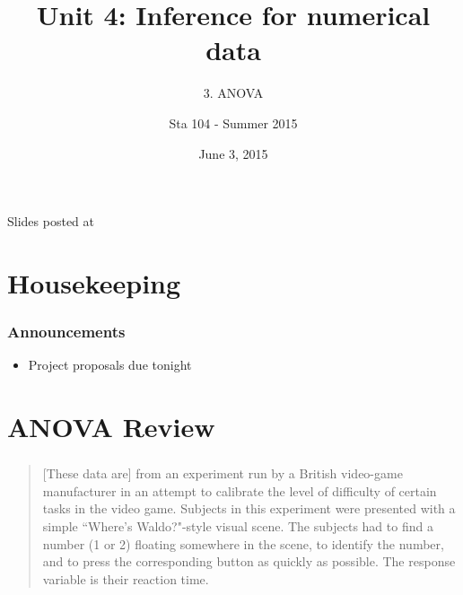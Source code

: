 \documentclass[slidestop,compress,mathserif,12pt,t,professionalfonts,xcolor=table]{beamer}
\title{Unit 4: Inference for numerical data}
\subtitle{3. ANOVA}
\author{Sta 104 - Summer 2015}
\date{June 3, 2015}
\institute{Duke University, Department of Statistical Science}
\begin{document}



\begin{frame}[plain]

\titlepage
\vfill
{\scriptsize {} \hfill Slides posted at  \webLink{\CourseSite}{\CourseSite}}
\addtocounter{framenumber}{-1} 

\end{frame}


\section{Housekeeping}


\begin{frame}
\frametitle{Announcements}

\begin{itemize}

\item Project proposals due tonight

\end{itemize}

\end{frame}


\section{ANOVA Review}


\begin{frame}
  \frametitle{}

\vfill

\begin{quote} 
[These data are] from an experiment run by a British video-game manufacturer in an attempt to calibrate the level of difficulty of certain tasks in the video game. Subjects in this experiment were presented with a simple ``Where's Waldo?"-style visual scene. The subjects had to find a number (1 or 2) floating somewhere in the scene, to identify the number, and to press the corresponding button as quickly as possible. The response variable is their reaction time.
\end{quote}

\vfill


\end{frame}
\end{document}
